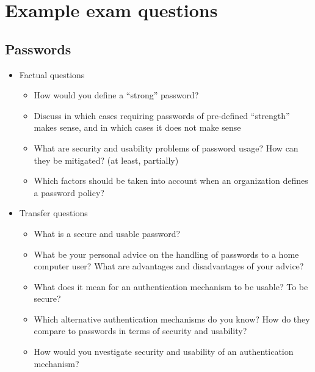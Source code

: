 \section{Example exam questions}
\subsection{Passwords}
\begin{itemize}
	\item
		Factual questions
		\begin{itemize}
			\item
				How would you define a \enquote{strong} password?


			\item
				Discuss in which cases requiring passwords of pre-defined \enquote{strength} makes sense, and in which cases it does not make sense
			\item
				What are security and usability problems of password usage? How can they be mitigated? (at least, partially)
			\item
				Which factors should be taken into account when an organization defines a password policy?
		\end{itemize}
	\item
		Transfer questions
		\begin{itemize}
			\item
				What is a secure and usable password?
			\item
				What be your personal advice on the handling of passwords to a home computer user? What are advantages and disadvantages of your advice?
			\item
				What does it mean for an authentication mechanism to be usable? To be secure?
			\item
				Which alternative authentication mechanisms do you know? How do they compare to passwords in terms of security and usability?
			\item
				How would you nvestigate security and usability of an authentication mechanism?
		\end{itemize}
\end{itemize}

